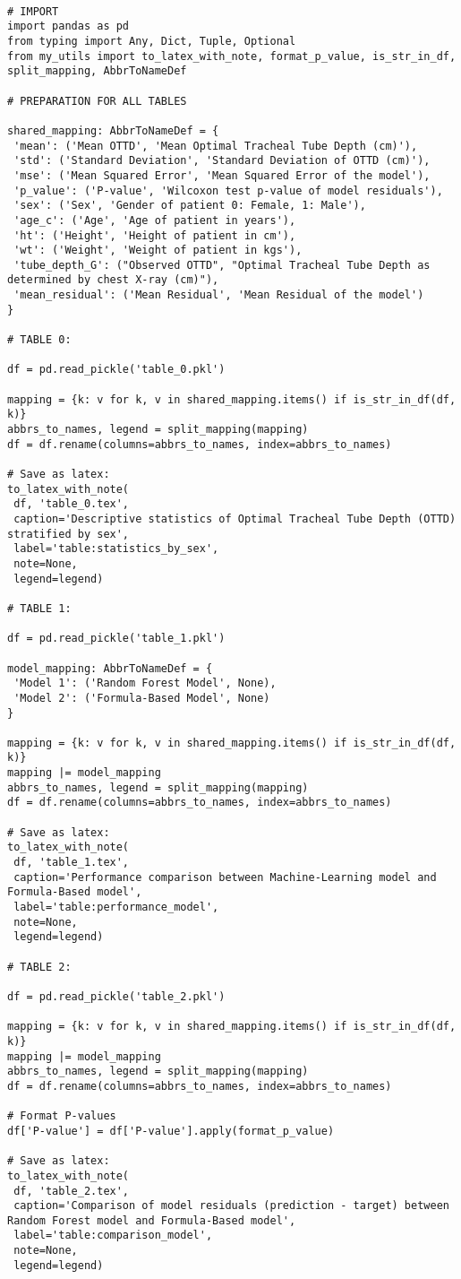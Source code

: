 \documentclass[11pt]{article}
\begin{document}
\begin{verbatim}

# IMPORT
import pandas as pd
from typing import Any, Dict, Tuple, Optional
from my_utils import to_latex_with_note, format_p_value, is_str_in_df, split_mapping, AbbrToNameDef

# PREPARATION FOR ALL TABLES

shared_mapping: AbbrToNameDef = {
 'mean': ('Mean OTTD', 'Mean Optimal Tracheal Tube Depth (cm)'),
 'std': ('Standard Deviation', 'Standard Deviation of OTTD (cm)'),
 'mse': ('Mean Squared Error', 'Mean Squared Error of the model'),
 'p_value': ('P-value', 'Wilcoxon test p-value of model residuals'),
 'sex': ('Sex', 'Gender of patient 0: Female, 1: Male'),
 'age_c': ('Age', 'Age of patient in years'),
 'ht': ('Height', 'Height of patient in cm'),
 'wt': ('Weight', 'Weight of patient in kgs'),
 'tube_depth_G': ("Observed OTTD", "Optimal Tracheal Tube Depth as determined by chest X-ray (cm)"),
 'mean_residual': ('Mean Residual', 'Mean Residual of the model')
}

# TABLE 0:

df = pd.read_pickle('table_0.pkl')

mapping = {k: v for k, v in shared_mapping.items() if is_str_in_df(df, k)} 
abbrs_to_names, legend = split_mapping(mapping)
df = df.rename(columns=abbrs_to_names, index=abbrs_to_names)

# Save as latex:
to_latex_with_note(
 df, 'table_0.tex',
 caption='Descriptive statistics of Optimal Tracheal Tube Depth (OTTD) stratified by sex', 
 label='table:statistics_by_sex',
 note=None,
 legend=legend)

# TABLE 1:

df = pd.read_pickle('table_1.pkl')

model_mapping: AbbrToNameDef = {
 'Model 1': ('Random Forest Model', None),
 'Model 2': ('Formula-Based Model', None)
}

mapping = {k: v for k, v in shared_mapping.items() if is_str_in_df(df, k)} 
mapping |= model_mapping
abbrs_to_names, legend = split_mapping(mapping)
df = df.rename(columns=abbrs_to_names, index=abbrs_to_names)

# Save as latex:
to_latex_with_note(
 df, 'table_1.tex',
 caption='Performance comparison between Machine-Learning model and Formula-Based model', 
 label='table:performance_model',
 note=None,
 legend=legend)

# TABLE 2:

df = pd.read_pickle('table_2.pkl')

mapping = {k: v for k, v in shared_mapping.items() if is_str_in_df(df, k)} 
mapping |= model_mapping
abbrs_to_names, legend = split_mapping(mapping)
df = df.rename(columns=abbrs_to_names, index=abbrs_to_names)

# Format P-values
df['P-value'] = df['P-value'].apply(format_p_value)

# Save as latex:
to_latex_with_note(
 df, 'table_2.tex',
 caption='Comparison of model residuals (prediction - target) between Random Forest model and Formula-Based model', 
 label='table:comparison_model',
 note=None,
 legend=legend)

\end{verbatim}
\end{document}
